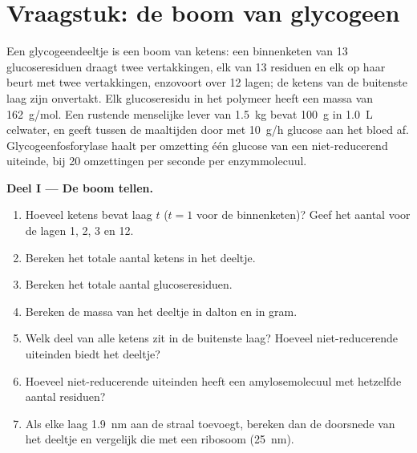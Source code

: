 \section{Vraagstuk: de boom van glycogeen}

\begin{problem}
\label{pb:b1:carbohydrates:1}
Een glycogeendeeltje is een boom van ketens: een binnenketen van \qty{13}{}
glucoseresiduen draagt twee vertakkingen, elk van \qty{13}{} residuen en elk op
haar beurt met twee vertakkingen, enzovoort over \qty{12}{} lagen; de ketens van
de buitenste laag zijn onvertakt. Elk glucoseresidu in het polymeer heeft een
massa van \qty{162}{g/mol}. Een rustende menselijke lever van \qty{1.5}{kg} bevat
\qty{100}{g}  in \qty{1.0}{L} celwater, en geeft tussen de maaltijden
door met \qty{10}{g/h} glucose aan het bloed af. Glycogeenfosforylase haalt per
omzetting één glucose van een niet-reducerend uiteinde, bij \qty{20}{} omzettingen
per seconde per enzymmolecuul.

\medskip
\noindent\textbf{Deel I --- De boom tellen.}
\begin{enumerate}
  \item Hoeveel ketens bevat laag $t$ ($t = 1$ voor de binnenketen)? Geef
        het aantal voor de lagen 1, 2, 3 en 12.
  \item Bereken het totale aantal ketens in het deeltje.
  \item Bereken het totale aantal glucoseresiduen.
  \item Bereken de massa van het deeltje in dalton en in gram.
  \item Welk deel van alle ketens zit in de buitenste laag? Hoeveel
        niet-reducerende uiteinden biedt het deeltje?
  \item Hoeveel niet-reducerende uiteinden heeft een amylosemolecuul met
        hetzelfde aantal residuen?
  \item Als elke laag \qty{1.9}{nm} aan de straal toevoegt, bereken dan de
        doorsnede van het deeltje en vergelijk die met een ribosoom
        (\qty{25}{nm}).
\end{enumerate}


\end{problem}
